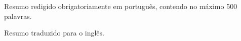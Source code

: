 
Resumo redigido obrigatoriamente em português, contendo no máximo 500 palavras.

\cleardoublepage


Resumo traduzido para o inglês.
